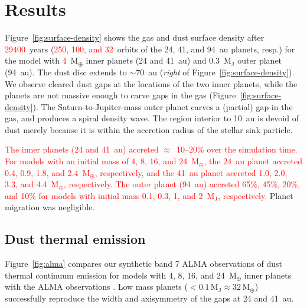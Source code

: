 \documentclass[usenatbib,a4paper,times]{mnras}
\renewcommand{\earth}{\mathrm{M}_{\oplus}}
\newcommand{\new}[1]{{\textcolor{red}{#1}}}
\begin{document}
\section{Results}
\label{sec:results}

Figure~\ref{fig:surface-density} shows the gas and dust surface density after
\new{29400}~years (\new{250, 100, and 32}~orbits of the 24, 41, and 94~au
planets, resp.) for the model with \new{4}~$\earth{}$ inner planets (24 and
41~au) and 0.3~$\mathrm{M_J}$ outer planet (94~au). The dust disc extends to
$\sim 70$~au (\textit{right} of Figure~\ref{fig:surface-density}). We observe
cleared dust gaps at the locations of the two inner planets, while the planets
are not massive enough to carve gaps in the gas
(Figure~\ref{fig:surface-density}). The Saturn-to-Jupiter-mass outer planet
carves a (partial) gap in the gas, and produces a spiral density wave. The
region interior to 10~au is devoid of dust merely because it is within the
accretion radius of the stellar sink particle.

\new{The inner planets (24 and 41~au) accreted $\approx$~10--20\% over the
simulation time. For models with an initial mass of 4, 8, 16, and 24~$\earth{}$,
the 24~au planet accreted 0.4, 0.9, 1.8, and 2.4~$\earth{}$, respectively, and
the 41~au planet accreted 1.0, 2.0, 3.3, and 4.4~$\earth{}$, respectively. The
outer planet (94~au) accreted 65\%, 45\%, 20\%, and 10\% for models with initial
mass 0.1, 0.3, 1, and 2~$\mathrm{M_J}$, respectively.} Planet migration was
negligible.




\subsection{Dust thermal emission}

Figure~\ref{fig:alma} compares our synthetic band 7 ALMA observations of dust
thermal continuum emission for models with 4, 8, 16, and 24~$\earth{}$ inner
planets with the ALMA observations \citep{andrews:2016}. Low mass planets ($<
0.1\,\mathrm{M_J} \approx 32\,\earth{}$) successfully reproduce the width and
axisymmetry of the gaps at 24 and 41~au.
\end{document}
